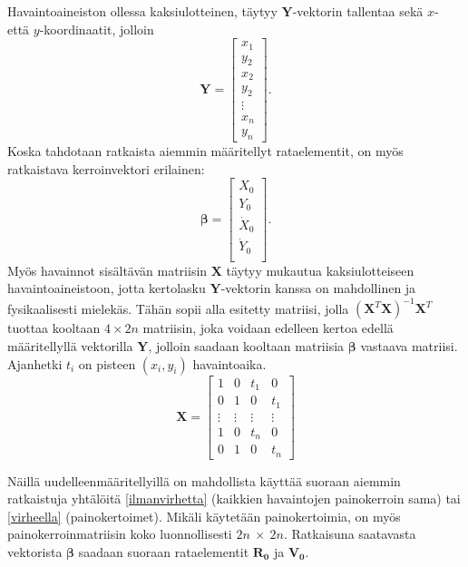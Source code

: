 \documentclass[12pt,a4paper,titlepage]{article}
\newcommand{\matr}[1]{\bm{#1}}
\newcommand{\transpose}[1]{{#1}^T}
\begin{document}
Havaintoaineiston ollessa kaksiulotteinen, täytyy $\matr{Y}$-vektorin tallentaa sekä $x$- että $y$-koordinaatit, jolloin
\begin{equation*}
	\matr{Y}
	=
	\begin{bmatrix}
		x_1 \\
		y_2 \\
		x_2 \\
		y_2 \\
		\vdots \\
		x_n \\
		y_n
	\end{bmatrix}.
\end{equation*}
Koska tahdotaan ratkaista aiemmin määritellyt rataelementit, on myös ratkaistava kerroinvektori erilainen:
\begin{equation*}
	\matr{\beta}
	=
	\begin{bmatrix}
		X_0 \\
		Y_0 \\
		\dot{X}_0 \\
		\dot{Y}_0 \\
	\end{bmatrix}.
\end{equation*}
Myös havainnot sisältävän matriisin $\matr{X}$ täytyy mukautua kaksiulotteiseen havaintoaineistoon, jotta kertolasku $\matr{Y}$-vektorin kanssa on mahdollinen ja fysikaalisesti mielekäs. Tähän sopii alla esitetty matriisi, jolla $(\transpose{\matr{X}}\matr{X})^{-1}\transpose{\matr{X}}$ tuottaa
kooltaan $4 \times 2n$ matriisin, joka voidaan edelleen kertoa edellä määritellyllä vektorilla $\matr{Y}$, jolloin saadaan kooltaan matriisia $\matr{\beta}$ vastaava matriisi. Ajanhetki $t_i$ on pisteen $(x_i, y_i)$ havaintoaika.
\begin{equation*}
	\matr{X}
	=
	\begin{bmatrix}
		1 & 0 & t_1 & 0 \\
		0 & 1 & 0 & t_1 \\
		\vdots & \vdots & \vdots & \vdots \\
		1 & 0 & t_n & 0 \\
		0 & 1 & 0 & t_n
	\end{bmatrix} 
\end{equation*}

Näillä uudelleenmääritellyillä on mahdollista käyttää suoraan aiemmin ratkaistuja yhtälöitä \ref{ilmanvirhetta} (kaikkien havaintojen painokerroin sama) tai \ref{virheella} (painokertoimet). Mikäli käytetään painokertoimia, on myös painokerroinmatriisin koko luonnollisesti $2n~\times~2n$. Ratkaisuna saatavasta vektorista $\matr{\beta}$ saadaan suoraan rataelementit $\matr{R_0}$ ja $\matr{V_0}$.
\end{document}
